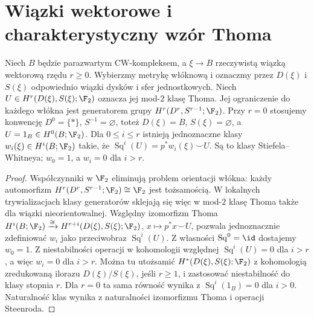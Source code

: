 \section{Wiązki wektorowe i charakterystyczny wzór Thoma}
\begin{twierdzenie}
\label{thm:thom-wu-v8}
Niech $B$ będzie parazwartym CW-kompleksem, a
$\xi\to B$ rzeczywistą wiązką wektorową rzędu $r\ge0$.
Wybierzmy metrykę włóknową i oznaczmy przez $D(\xi)$
i $S(\xi)$ odpowiednio wiązki dysków i sfer jednostkowych.
Niech $U\in H^r(D(\xi),S(\xi);\F_2)$ oznacza jej
mod-$2$ klasę Thoma. Jej ograniczenie do każdego
włókna jest generatorem grupy
$H^r(D^r,S^{r-1};\F_2)$.
Przy $r=0$ stosujemy konwencję $D^0=\{*\}$,
$S^{-1}=\varnothing$, toteż $D(\xi)=B$,
$S(\xi)=\varnothing$, a $U=1_B\in H^0(B;\F_2)$.
Dla $0\le i\le r$ istnieją jednoznaczne klasy
$w_i(\xi)\in H^i(B;\F_2)$ takie, że
$\operatorname{Sq}^i(U)=p^*w_i(\xi)\smile U$.
Są to klasy Stiefela--Whitneya; $w_0=1$,
a $w_i=0$ dla $i>r$.
\end{twierdzenie}
\begin{proof}
Współczynniki w $\F_2$ eliminują problem
orientacji włókna: każdy automorfizm
$H^r(D^r,S^{r-1};\F_2)\cong\F_2$ jest
tożsamością. W lokalnych trywializacjach
klasy generatorów sklejają się więc w
mod-$2$ klasę Thoma także dla wiązki
nieorientowalnej. Względny izomorfizm Thoma
$H^i(B;\F_2)\xrightarrow{\cong}
H^{r+i}(D(\xi),S(\xi);\F_2)$,
$x\mapsto p^*x\smile U$,
pozwala jednoznacznie zdefiniować $w_i$ jako przeciwobraz
$\operatorname{Sq}^i(U)$. Z własności
$\operatorname{Sq}^0=\id$ dostajemy $w_0=1$.
Z niestabilności operacji w kohomologii względnej
$\operatorname{Sq}^i(U)=0$ dla $i>r$,
a więc $w_i=0$ dla $i>r$. Można tu
utożsamić $H^*(D(\xi),S(\xi);\F_2)$ z
kohomologią zredukowaną ilorazu
$D(\xi)/S(\xi)$, jeśli $r\ge1$,
i zastosować niestabilność do klasy stopnia $r$.
Dla $r=0$ ta sama równość wynika z
$\operatorname{Sq}^i(1_B)=0$ dla $i>0$.
Naturalność klas wynika z naturalności izomorfizmu
Thoma i operacji Steenroda.
\end{proof}

